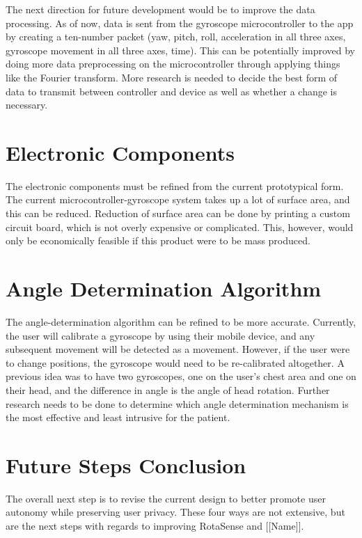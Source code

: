 The next direction for future development would be to improve the data
processing. As of now, data is sent from the gyroscope microcontroller to the
app by creating a ten-number packet (yaw, pitch, roll, acceleration in all
three axes, gyroscope movement in all three axes, time). This can be
potentially improved by doing more data preprocessing on the microcontroller
through applying things like the Fourier transform. More research is needed to
decide the best form of data to transmit between controller and device as well
as whether a change is necessary.

\section{Electronic Components}

The electronic components must be refined from the current prototypical
form. The current microcontroller-gyroscope system takes up a lot of surface
area, and this can be reduced. Reduction of surface area can be done by
printing a custom circuit board, which is not overly expensive or
complicated. This, however, would only be economically feasible if this product
were to be mass produced. 

\section{Angle Determination Algorithm}

The angle-determination algorithm can be refined to be more
accurate. Currently, the user will calibrate a gyroscope by using their mobile
device, and any subsequent movement will be detected as a movement. However, if
the user were to change positions, the gyroscope would need to be re-calibrated
altogether. A previous idea was to have two gyroscopes, one on the user’s chest
area and one on their head, and the difference in angle is the angle of head
rotation. Further research needs to be done to determine which angle
determination mechanism is the most effective and least intrusive for the
patient. 

\section{Future Steps Conclusion}

The overall next step is to revise the current design to better promote user
autonomy while preserving user privacy. These four ways are not extensive, but
are the next steps with regards to improving RotaSense and [[Name]].

